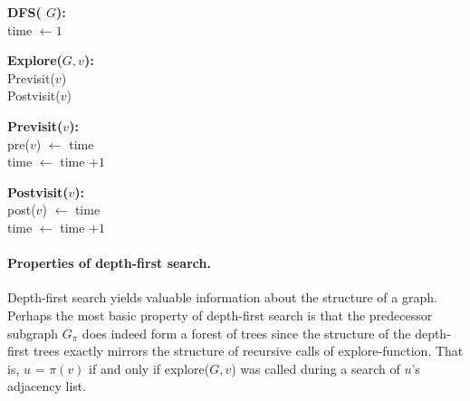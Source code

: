 \begin{minipage}[t]{0.46\textwidth}

  \begin{algorithm}[H]
   \textbf{DFS( $G$):}\\
    time $ \leftarrow 1 $\\

  \end{algorithm}

  \begin{algorithm}[H]
    \textbf{Explore($G,v$):}\\
     Previsit($v$)\\
    Postvisit($v$)
  \end{algorithm}
  \end{minipage}
   \hfill
   \begin{minipage}[t]{0.46\textwidth}
  \begin{algorithm}[H]
    \textbf{Previsit($v$):}\\
    pre($v$) $\leftarrow $ time \\
    time $\leftarrow$ time $+1$
  \end{algorithm}
  \begin{algorithm}[H]
   \textbf{Postvisit($v$):} \\
    post($v$) $\leftarrow $ time \\
    time $\leftarrow$ time $+1$
  \end{algorithm}

  \end{minipage}

\paragraph{Properties of depth-first search.} Depth-first search yields valuable information about the structure of a graph. Perhaps the most basic property of depth-first search is that the predecessor subgraph $G_{\pi}$ does indeed form a forest of trees since the structure of the depth-first trees exactly mirrors the structure of recursive calls of explore-function. That is, $u$ = $\pi\left( v \right)$ if and only if explore($G, v$) was called during a search of $ u$'s adjacency list.


